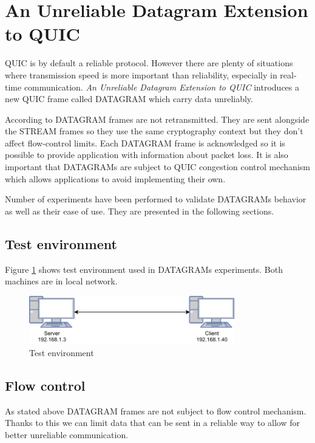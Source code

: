 \section{An Unreliable Datagram Extension to QUIC}
\label{sec:datagrams}
QUIC is by default a reliable protocol.
However there are plenty of situations where transmission speed is more important than reliability, especially in real-time communication.
\textit{An Unreliable Datagram Extension to QUIC} \cite{ietf-quic-datagram-02} introduces a new QUIC frame called DATAGRAM which carry data unreliably.

According to \cite{ietf-quic-datagram-02} DATAGRAM frames are not retransmitted.
They are sent alongside the STREAM frames so they use the same cryptography context but they don't affect flow-control limits.
Each DATAGRAM frame is acknowledged so it is possible to provide application with information about packet loss.
It is also important that DATAGRAMs are subject to QUIC congestion control mechanism which allows applications to avoid implementing their own.

Number of experiments have been performed to validate DATAGRAMs behavior as well as their ease of use.
They are presented in the following sections.

\subsection{Test environment}
\label{sec:test_env}
Figure \ref{fig:dgram_test_env} shows test environment used in DATAGRAMs experiments.
Both machines are in local network.
 
\begin{figure}
  \centering
  \includegraphics[width=0.8\textwidth]{img/__09__datagrams/dgram_test_env.pdf}
  \caption{Test environment}
  \label{fig:dgram_test_env}
\end{figure}
\subsection{Flow control}
As stated above DATAGRAM frames are not subject to flow control mechanism.
Thanks to this we can limit data that can be sent in a reliable way to allow for better unreliable communication.
